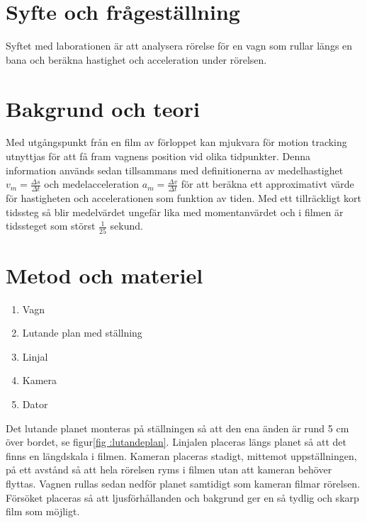 \documentclass[11p, titlepage, oneside, a4paper]{article}
\begin{document}
	\newpage

	
	\setlength{\parindent}{0pt}
	\setlength{\parskip}{10pt}
	
	\section{Syfte och frågeställning}
		Syftet med laborationen är att analysera rörelse för en vagn som rullar längs en bana och beräkna hastighet och
        acceleration under rörelsen.

	\section{Bakgrund och teori}
        Med utgångspunkt från en film av förloppet kan mjukvara för motion tracking utnyttjas för att få fram vagnens
        position vid olika tidpunkter. Denna information används sedan tillsammans med definitionerna av medelhastighet
        $v_m = \frac{\Delta s}{\Delta t}$ och medelacceleration $a_m = \frac{\Delta v}{\Delta t}$ för att beräkna ett approximativt värde
        för hastigheten och accelerationen som funktion av tiden. Med ett tillräckligt kort tidssteg så blir medelvärdet
        ungefär lika med momentanvärdet och i filmen är tidssteget som störst $\frac{1}{25}$ sekund.  \parencite{impuls}
	

	\section{Metod och materiel}
        \begin{enumerate}
            \item Vagn
            \item Lutande plan med ställning
            \item Linjal
            \item Kamera
            \item Dator
        \end{enumerate}
        
        Det lutande planet monteras på ställningen så att den ena änden är rund 5 cm över bordet, se figur\ref{fig
:lutandeplan}.
        Linjalen placeras längs planet så att det finns en längdskala  i filmen.
        Kameran placeras stadigt, mittemot uppställningen, på ett avstånd så att hela rörelsen ryms i filmen utan att
        kameran behöver flyttas.
        Vagnen rullas sedan nedför planet samtidigt som kameran filmar rörelsen.
        Försöket placeras så att ljusförhållanden och bakgrund ger en så tydlig och skarp film som möjligt.
        
\end{document}
